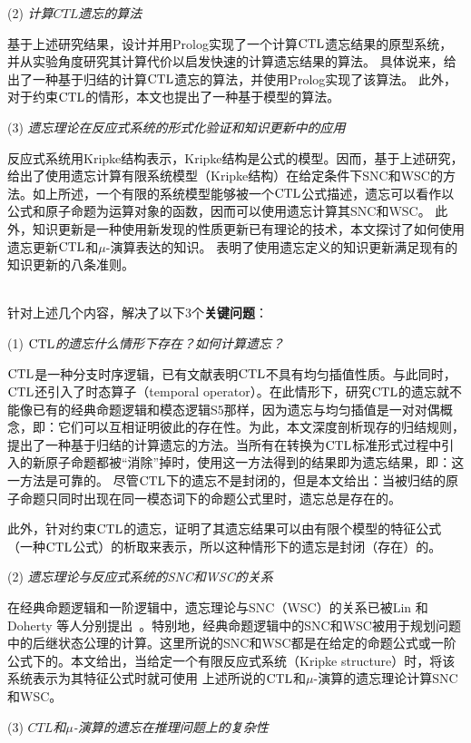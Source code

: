 (2) {\em 计算$CTL$遗忘的算法}

基于上述研究结果，设计并用Prolog实现了一个计算$\textrm{CTL}$遗忘结果的原型系统，并从实验角度研究其计算代价以启发快速的计算遗忘结果的算法。
具体说来，给出了一种基于归结的计算$\textrm{CTL}$遗忘的算法，并使用Prolog实现了该算法。
此外，对于约束$\textrm{CTL}$的情形，本文也提出了一种基于模型的算法。

(3) {\em 遗忘理论在反应式系统的形式化验证和知识更新中的应用}

反应式系统用Kripke结构表示，Kripke结构是公式的模型。因而，基于上述研究，给出了使用遗忘计算有限系统模型（Kripke结构）在给定条件下SNC和WSC的方法。如上所述，一个有限的系统模型能够被一个$\textrm{CTL}$公式描述，遗忘可以看作以公式和原子命题为运算对象的函数，因而可以使用遗忘计算其SNC和WSC。
此外，知识更新是一种使用新发现的性质更新已有理论的技术，本文探讨了如何使用遗忘更新$\textrm{CTL}$和$\mu$-演算表达的知识。
表明了使用遗忘定义的知识更新满足现有的知识更新的八条准则。

~\\
针对上述几个内容，解决了以下3个\textbf{关键问题}：

(1) {\em $\textrm{CTL}$的遗忘什么情形下存在？如何计算遗忘？}

$\textrm{CTL}$是一种分支时序逻辑，已有文献表明$\textrm{CTL}$不具有均匀插值性质。与此同时，$\textrm{CTL}$还引入了时态算子（temporal operator）。在此情形下，研究$\textrm{CTL}$的遗忘就不能像已有的经典命题逻辑和模态逻辑S5那样，因为遗忘与均匀插值是一对对偶概念，即：它们可以互相证明彼此的存在性。为此，本文深度剖析现存的归结规则，提出了一种基于归结的计算遗忘的方法。当所有在转换为$\textrm{CTL}$标准形式过程中引入的新原子命题都被“消除”掉时，使用这一方法得到的结果即为遗忘结果，即：这一方法是可靠的。
尽管$\textrm{CTL}$下的遗忘不是封闭的，但是本文给出：当被归结的原子命题只同时出现在同一模态词下的命题公式里时，遗忘总是存在的。

此外，针对约束$\textrm{CTL}$的遗忘，证明了其遗忘结果可以由有限个模型的特征公式（一种$\textrm{CTL}$公式）的析取来表示，所以这种情形下的遗忘是封闭（存在）的。

(2) {\em 遗忘理论与反应式系统的SNC和WSC的关系}

在经典命题逻辑和一阶逻辑中，遗忘理论与SNC（WSC）的关系已被Lin 和 Doherty 等人分别提出~\cite{DBLP:journals/ai/Lin01,DBLP:conf/ijcai/DohertyLS01}。特别地，经典命题逻辑中的SNC和WSC被用于规划问题中的后继状态公理的计算。这里所说的SNC和WSC都是在给定的命题公式或一阶公式下的。本文给出，当给定一个有限反应式系统（Kripke structure）时，将该系统表示为其特征公式时就可使用
上述所说的$\textrm{CTL}$和$\mu$-演算的遗忘理论计算SNC和WSC。



(3) {\em $CTL$和$\mu$-演算的遗忘在推理问题上的复杂性}

